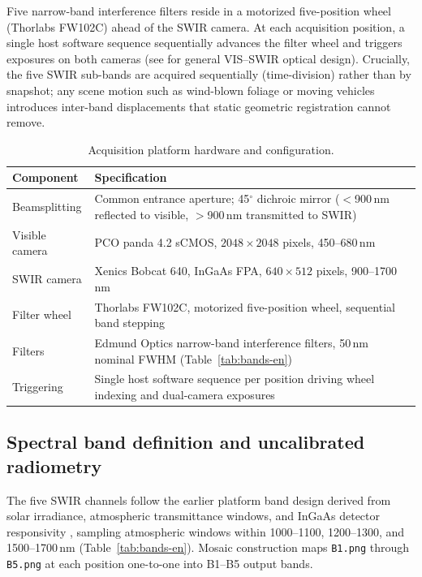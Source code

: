 \documentclass[a4paper,10pt]{article}
\begin{document}
Five narrow-band interference filters reside in a motorized five-position wheel (Thorlabs FW102C) ahead of the SWIR camera. At each acquisition position, a single host software sequence sequentially advances the filter wheel and triggers exposures on both cameras (see \cite{yu2024} for general VIS--SWIR optical design). Crucially, the five SWIR sub-bands are acquired sequentially (time-division) rather than by snapshot; any scene motion such as wind-blown foliage or moving vehicles introduces inter-band displacements that static geometric registration cannot remove.

\begin{table}[htbp]
\centering
\caption{Acquisition platform hardware and configuration.}
\label{tab:hardware-en}
\small
\begin{tabularx}{\textwidth}{@{}>{\centering\arraybackslash}p{}X@{}}
\toprule
Component & Specification\\
\midrule
Beamsplitting & Common entrance aperture; 45$^{\circ}$ dichroic mirror ($<$900\,nm reflected to visible, $>$900\,nm transmitted to SWIR)\\
Visible camera & PCO panda 4.2 sCMOS, $2048\times2048$ pixels, 450--680\,nm\\
SWIR camera & Xenics Bobcat 640, InGaAs FPA, $640\times512$ pixels, 900--1700\,nm\\
Filter wheel & Thorlabs FW102C, motorized five-position wheel, sequential band stepping\\
Filters & Edmund Optics narrow-band interference filters, 50\,nm nominal FWHM (Table~\ref{tab:bands-en})\\
Triggering & Single host software sequence per position driving wheel indexing and dual-camera exposures\\
\bottomrule
\end{tabularx}
\end{table}

\subsection{Spectral band definition and uncalibrated radiometry}
The five SWIR channels follow the earlier platform band design derived from solar irradiance, atmospheric transmittance windows, and InGaAs detector responsivity \cite{chen2026thesis}, sampling atmospheric windows within 1000--1100, 1200--1300, and 1500--1700\,nm (Table~\ref{tab:bands-en}). Mosaic construction maps \texttt{B1.png} through \texttt{B5.png} at each position one-to-one into B1--B5 output bands.
\end{document}
